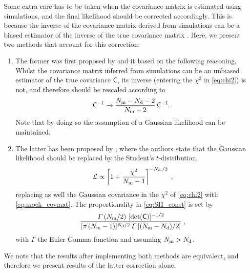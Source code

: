 \documentclass[astrosymb,twocolumn]{aastex631}
\let\Gamma\varGamma
\begin{document}
Some extra care has to be taken when the covariance matrix is estimated using simulations, and the final likelihood should be corrected accordingly. This is because the inverse of the covariance matrix derived from simulations can be a biased estimator of the inverse of the true covariance matrix \citep{Hartlap}. Here, we present two methods that account for this correction:
\begin{enumerate}
    \item The former was first proposed by \citet{Hartlap} and it based on the following reasoning. Whilst the covariance matrix inferred from simulations can be an unbiased estimator of the true covariance \(\mathsf C\), its inverse (entering the \(\chi^2\) in \autoref{eq:chi2}) is not, and therefore should be rescaled according to \citep{Anderson2004}
\begin{equation}
{\mathsf C}^{-1} \rightarrow \frac{N_{\rm m}-N_{\rm d}-2}{N_{\rm m}-2}\,{\mathsf C}^{-1}\;.
    \label{eq:Anderson_Hartlap}
\end{equation}
Note that by doing so the assumption of a Gaussian likelihood can be maintained.
    \item The latter has been proposed by \citet{SH2016}, where the authors state that the Gaussian likelihood should be replaced by the Student's \(t\)-distribution,
\begin{equation}
\mathcal{L}\propto \left[1+\frac{ \chi^2}{N_{\rm m}-1}\right]^{-N_{\rm m}/2}\;,
    \label{eq:SH_like}
\end{equation}
replacing as well the Gaussian covariance in the \(\chi^2\) of \autoref{eq:chi2} with \autoref{eq:mock_covmat}. The proportionality in \autoref{eq:SH_const} is set by
\begin{equation}
\frac{{\Gamma} \left(N_{\rm m}/2\right )\,[\text{det}({\mathsf C})]^{-1/2}}{[\pi\,(N_{\rm m}-1)]^{N_{\rm d}/2}\,\Gamma \left[(N_{\rm m}-N_{\rm d})/2\right]}\;,
    \label{eq:SH_const}
\end{equation}
with \(\Gamma\) the Euler Gamma function and assuming \(N_{\rm m}>N_{\rm d}\).
\end{enumerate}

We note that the results after implementing both methods are equivalent, and therefore we present results of the latter correction alone.
\end{document}
